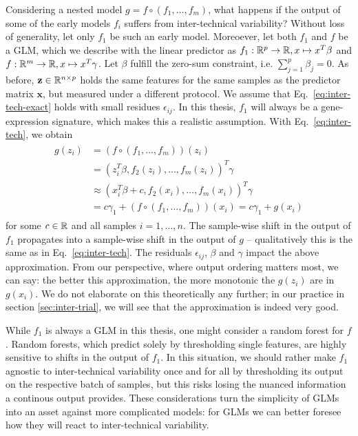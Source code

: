 Considering a nested model $g = f \circ (f_1, \ldots, f_m)$, what happens if the output of some of 
the early models $f_i$ suffers from inter-technical variability? Without loss of generality, let 
only $f_1$ be such an early model. Moreoever, let both $f_1$ and $f$ be a GLM, which we describe 
with the linear predictor as $f_1: \mathbb{R}^p \to \mathbb{R}, x \mapsto x^T \beta$ and $f: \mathbb{R}^m \to \mathbb{R}, 
x \mapsto x^T \gamma$. Let $\beta$ fulfill the zero-sum constraint, i.e. $\sum_{j=1}^p \beta_j = 0$.
As before, $\mathbf{z} \in \mathbb{R}^{n \times p}$ holds the same features for the same samples as the 
predictor matrix $\mathbf{x}$, but measured under a different protocol.
We assume that Eq.\ \ref{eq:inter-tech-exact} holds with small residues $\epsilon_{ij}$. In this 
thesis, $f_1$ will always be a gene-expression signature, which makes this a realistic assumption. 
With Eq.\ \ref{eq:inter-tech}, we obtain
\begin{align}\label{eq:inter-tech-nested}
\begin{split}
    g(z_i) &= (f \circ (f_1, \ldots, f_m))(z_i) \\ 
    &= (z_i^T \beta, f_2(z_i), \ldots, f_m(z_i))^T \gamma \\
    &\approx (x_i^T \beta + c, f_2(x_i), \ldots, f_m(x_i))^T \gamma \\ 
    &= c \gamma_1 + (f \circ (f_1, \ldots, f_m))(x_i) = c \gamma_1 + g(x_i)
\end{split}
\end{align}
for some $c \in \mathbb{R}$ and all samples $i = 1, \ldots, n$. The sample-wise shift in the output of 
$f_1$ propagates into a sample-wise shift in the output of $g$ -- qualitatively this is the same 
as in Eq.\ \ref{eq:inter-tech}. The residuals $\epsilon_{ij}$, $\beta$ and $\gamma$ impact the 
above approximation. From our 
perspective, where output ordering matters most, we can say: the better this approximation, the more 
monotonic the $g(z_i)$ are in $g(x_i)$. We do not elaborate on this theoretically any further; 
in our practice in section \ref{sec:inter-trial}, we will see that the approximation is indeed
very good.

While $f_1$ is always a GLM in this thesis, one might consider a random forest for $f$. Random 
forests, which predict solely by thresholding single features, are highly sensitive to shifts in 
the output of $f_1$. In this situation, we should rather make $f_1$ agnostic to inter-technical 
variability once and 
for all by thresholding its output on the respective batch of samples, but this risks losing the 
nuanced information a continous output provides. These considerations turn the simplicity of GLMs 
into an asset against more complicated models: for GLMs we can better foresee how they will react 
to inter-technical variability.

